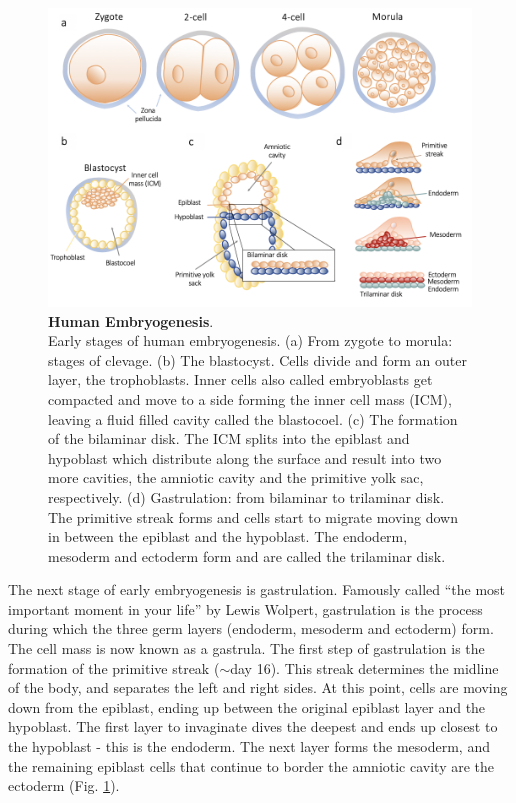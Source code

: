 \begin{figure}[h]
\centering
\includegraphics[width=14.5cm]{Chapter1/Fig/embryogenesis_til_gastrulation.png}
\caption[Human Embryogenesis]{\textbf{Human Embryogenesis}.\\
Early stages of human embryogenesis.
(a) From zygote to morula: stages of clevage.
(b) The blastocyst.
Cells divide and form an outer layer, the trophoblasts.
Inner cells also called embryoblasts get compacted and move to a side forming the inner cell mass (ICM), leaving a fluid filled cavity called the blastocoel.
(c) The formation of the bilaminar disk.
The ICM splits into the epiblast and hypoblast which distribute along the surface and result into two more cavities, the amniotic cavity and the primitive yolk sac, respectively.
(d) Gastrulation: from bilaminar to trilaminar disk.
The primitive streak forms and cells start to migrate moving down in between the epiblast and the hypoblast.
The endoderm, mesoderm and ectoderm form and are called the trilaminar disk.}
\label{fig:embryogenesis}
\end{figure}

The next stage of early embryogenesis is gastrulation.
Famously called “the most important moment in your life” by Lewis Wolpert, gastrulation is the process during which the three germ layers (endoderm, mesoderm and ectoderm) form.
The cell mass is now known as a gastrula.
The first step of gastrulation is the formation of the primitive streak ($\sim$day 16).
This streak determines the midline of the body, and separates the left and right sides.
At this point, cells are moving down from the epiblast, ending up between the original epiblast layer and the hypoblast.
The first layer to invaginate dives the deepest and ends up closest to the hypoblast - this is the endoderm.
The next layer forms the mesoderm, and the remaining epiblast cells that continue to border the amniotic cavity are the ectoderm (Fig. \ref{fig:embryogenesis}).\\

